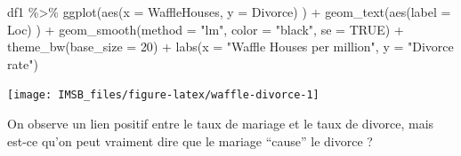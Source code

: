 \documentclass[
  a4paper,11pt,twoside,onecolumn,openright,final,oldfontcommands]{memoir}
\newenvironment{Shaded}{\begin{snugshade}}{\end{snugshade}}
\newcommand{\AttributeTok}[1]{\textcolor[rgb]{0.77,0.63,0.00}{#1}}
\newcommand{\ConstantTok}[1]{\textcolor[rgb]{0.00,0.00,0.00}{#1}}
\newcommand{\DecValTok}[1]{\textcolor[rgb]{0.00,0.00,0.81}{#1}}
\newcommand{\FloatTok}[1]{\textcolor[rgb]{0.00,0.00,0.81}{#1}}
\newcommand{\FunctionTok}[1]{\textcolor[rgb]{0.00,0.00,0.00}{#1}}
\newcommand{\NormalTok}[1]{#1}
\newcommand{\OtherTok}[1]{\textcolor[rgb]{0.56,0.35,0.01}{#1}}
\newcommand{\SpecialCharTok}[1]{\textcolor[rgb]{0.00,0.00,0.00}{#1}}
\newcommand{\StringTok}[1]{\textcolor[rgb]{0.31,0.60,0.02}{#1}}
\theoremstyle{definition}
\theoremstyle{definition}
\theoremstyle{definition}
\theoremstyle{definition}
\theoremstyle{remark}
\begin{document}
\begin{Shaded}
\begin{Highlighting}[]
\NormalTok{df1 }\SpecialCharTok{\%\textgreater{}\%}
  \FunctionTok{ggplot}\NormalTok{(}\FunctionTok{aes}\NormalTok{(}\AttributeTok{x =}\NormalTok{ WaffleHouses, }\AttributeTok{y =}\NormalTok{ Divorce) ) }\SpecialCharTok{+}
  \FunctionTok{geom\_text}\NormalTok{(}\FunctionTok{aes}\NormalTok{(}\AttributeTok{label =}\NormalTok{ Loc) ) }\SpecialCharTok{+}
  \FunctionTok{geom\_smooth}\NormalTok{(}\AttributeTok{method =} \StringTok{"lm"}\NormalTok{, }\AttributeTok{color =} \StringTok{"black"}\NormalTok{, }\AttributeTok{se =} \ConstantTok{TRUE}\NormalTok{) }\SpecialCharTok{+}
  \FunctionTok{theme\_bw}\NormalTok{(}\AttributeTok{base\_size =} \DecValTok{20}\NormalTok{) }\SpecialCharTok{+}
  \FunctionTok{labs}\NormalTok{(}\AttributeTok{x =} \StringTok{"Waffle Houses per million"}\NormalTok{, }\AttributeTok{y =} \StringTok{"Divorce rate"}\NormalTok{)}
\end{Highlighting}
\end{Shaded}

\begin{center}\texttt{[image: IMSB\_files/figure-latex/waffle-divorce-1]} \end{center}

On observe un lien positif entre le taux de mariage et le taux de divorce, mais est-ce qu'on peut vraiment dire que le mariage ``cause'' le divorce ?

\begin{Shaded}
\end{Shaded}
\end{document}
